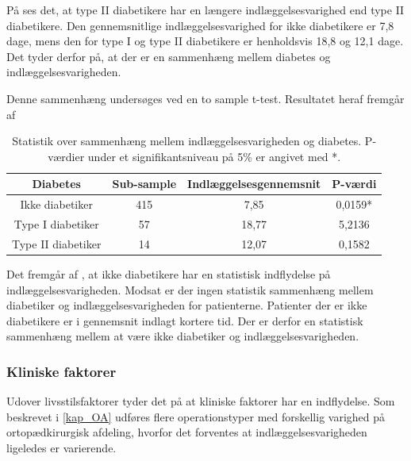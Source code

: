 \noindent
På  ses det, at type II diabetikere har en længere indlæggelsesvarighed end type II diabetikere. Den gennemsnitlige indlæggelsesvarighed for ikke diabetikere er 7,8 dage, mens den for type I og type II diabetikere er henholdsvis 18,8 og 12,1 dage. Det tyder derfor på, at der er en sammenhæng mellem diabetes og indlæggelsesvarigheden. 

Denne sammenhæng undersøges ved en to sample t-test. Resultatet heraf fremgår af 

\begin{table}[H]
\centering
\begin{tabular}{|c|c|c|c|}
\hline
\textbf{Diabetes}  & \textbf{Sub-sample} & \textbf{Indlæggelsesgennemsnit} & \textbf{P-værdi} \\ \hline
Ikke diabetiker    & 415                 & 7,85                            & 0,0159*          \\ \hline
Type I diabetiker  & 57                  & 18,77                           & 5,2136           \\ \hline
Type II diabetiker & 14                  & 12,07                           & 0,1582           \\ \hline
\end{tabular}
\caption{Statistik over sammenhæng mellem indlæggelsesvarigheden og diabetes. P-værdier under et signifikantsniveau på 5\% er angivet med *.}
\label{diabetesindlaegtab}
\end{table}

\noindent
Det fremgår af , at ikke diabetikere har en statistisk indflydelse på indlæggelsesvarigheden. Modsat er der ingen statistik sammenhæng mellem diabetiker og indlæggelsesvarigheden for patienterne. Patienter der er ikke diabetikere er i gennemsnit indlagt kortere tid. Der er derfor en statistisk sammenhæng mellem at være ikke diabetiker og indlæggelsesvarigheden.

\subsubsection{Kliniske faktorer}
Udover livsstilsfaktorer tyder det på at kliniske faktorer har en indflydelse. Som beskrevet i \ref{kap_OA} udføres flere operationstyper med forskellig varighed på ortopædkirurgisk afdeling, hvorfor det forventes at indlæggelsesvarigheden ligeledes er varierende. 


